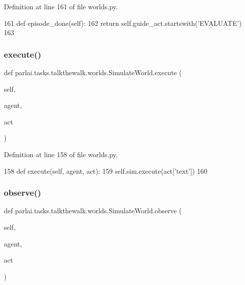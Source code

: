 Definition at line 161 of file worlds.\+py.


\begin{DoxyCode}
161     \textcolor{keyword}{def }episode\_done(self):
162         \textcolor{keywordflow}{return} self.guide\_act.startswith(\textcolor{stringliteral}{'EVALUATE'})
163 
\end{DoxyCode}
\mbox{\label{classparlai_1_1tasks_1_1talkthewalk_1_1worlds_1_1SimulateWorld_ab3c47cd21114eb9b4d043f76d2a387e7}} 
\subsubsection{\texorpdfstring{execute()}{execute()}}
{\footnotesize\ttfamily def parlai.\+tasks.\+talkthewalk.\+worlds.\+Simulate\+World.\+execute (\begin{DoxyParamCaption}\item[{}]{self,  }\item[{}]{agent,  }\item[{}]{act }\end{DoxyParamCaption})}



Definition at line 158 of file worlds.\+py.


\begin{DoxyCode}
158     \textcolor{keyword}{def }execute(self, agent, act):
159         self.sim.execute(act[\textcolor{stringliteral}{'text'}])
160 
\end{DoxyCode}
\mbox{\label{classparlai_1_1tasks_1_1talkthewalk_1_1worlds_1_1SimulateWorld_a1049d955f85f84855bda51be0f3e9a69}} 
\subsubsection{\texorpdfstring{observe()}{observe()}}
{\footnotesize\ttfamily def parlai.\+tasks.\+talkthewalk.\+worlds.\+Simulate\+World.\+observe (\begin{DoxyParamCaption}\item[{}]{self,  }\item[{}]{agent,  }\item[{}]{act }\end{DoxyParamCaption})}



